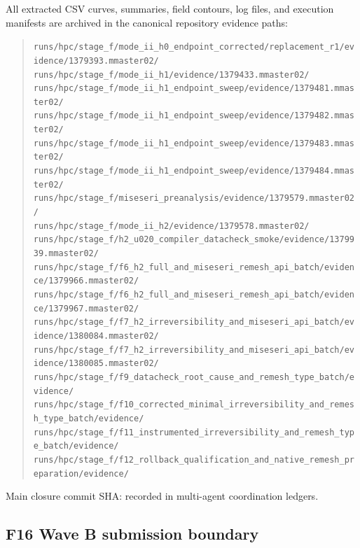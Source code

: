 All extracted CSV curves, summaries, field contours, log files, and execution manifests are archived in the canonical repository evidence paths:
\begin{quote}
\texttt{runs/hpc/stage\_f/mode\_ii\_h0\_endpoint\_corrected/replacement\_r1/evidence/1379393.mmaster02/}\\
\texttt{runs/hpc/stage\_f/mode\_ii\_h1/evidence/1379433.mmaster02/}\\
\texttt{runs/hpc/stage\_f/mode\_ii\_h1\_endpoint\_sweep/evidence/1379481.mmaster02/}\\
\texttt{runs/hpc/stage\_f/mode\_ii\_h1\_endpoint\_sweep/evidence/1379482.mmaster02/}\\
\texttt{runs/hpc/stage\_f/mode\_ii\_h1\_endpoint\_sweep/evidence/1379483.mmaster02/}\\
\texttt{runs/hpc/stage\_f/mode\_ii\_h1\_endpoint\_sweep/evidence/1379484.mmaster02/}\\
\texttt{runs/hpc/stage\_f/miseseri\_preanalysis/evidence/1379579.mmaster02/}\\
\texttt{runs/hpc/stage\_f/mode\_ii\_h2/evidence/1379578.mmaster02/}\\
\texttt{runs/hpc/stage\_f/h2\_u020\_compiler\_datacheck\_smoke/evidence/1379939.mmaster02/}\\
\texttt{runs/hpc/stage\_f/f6\_h2\_full\_and\_miseseri\_remesh\_api\_batch/evidence/1379966.mmaster02/}\\
\texttt{runs/hpc/stage\_f/f6\_h2\_full\_and\_miseseri\_remesh\_api\_batch/evidence/1379967.mmaster02/}\\
\texttt{runs/hpc/stage\_f/f7\_h2\_irreversibility\_and\_miseseri\_api\_batch/evidence/1380084.mmaster02/}\\
\texttt{runs/hpc/stage\_f/f7\_h2\_irreversibility\_and\_miseseri\_api\_batch/evidence/1380085.mmaster02/}
\texttt{runs/hpc/stage\_f/f9\_datacheck\_root\_cause\_and\_remesh\_type\_batch/evidence/}
\texttt{runs/hpc/stage\_f/f10\_corrected\_minimal\_irreversibility\_and\_remesh\_type\_batch/evidence/}
\texttt{runs/hpc/stage\_f/f11\_instrumented\_irreversibility\_and\_remesh\_type\_batch/evidence/}
\texttt{runs/hpc/stage\_f/f12\_rollback\_qualification\_and\_native\_remesh\_preparation/evidence/}
\end{quote}
Main closure commit SHA: recorded in multi-agent coordination ledgers.

\subsection{F16 Wave B submission boundary}

